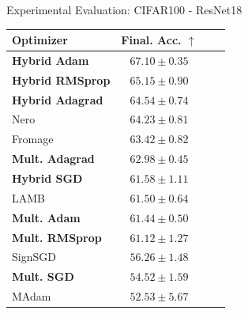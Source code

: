 \begin{frame}{Experimental Evaluation: CIFAR100 - ResNet18}
    \begin{table}
  \centering
    \begin{tabular}{l|ccc}
      \toprule
      Optimizer & Final. Acc. $\uparrow$ \\
      \midrule
      \textbf{Hybrid Adam} & $67.10\pm{0.35}$\\
      \textbf{Hybrid RMSprop} & $65.15\pm{0.90}$\\
      \textbf{Hybrid Adagrad} & $64.54\pm{0.74}$ \\
      Nero & $64.23\pm{0.81}$ \\
      Fromage & $63.42\pm{0.82}$ \\
      \textbf{Mult. Adagrad} & $62.98\pm{0.45}$ \\
      \textbf{Hybrid SGD} & $61.58\pm{1.11}$ \\
      LAMB & $61.50\pm{0.64}$  \\
      \textbf{Mult. Adam} & $61.44\pm{0.50}$ \\
      \textbf{Mult. RMSprop} & $61.12\pm{1.27}$ \\
      SignSGD & $56.26\pm{1.48}$ \\
      \textbf{Mult. SGD} & $54.52\pm{1.59}$ \\
      MAdam & $52.53\pm{5.67}$  \\

      \bottomrule
    \end{tabular}
  \end{table}
\end{frame}

